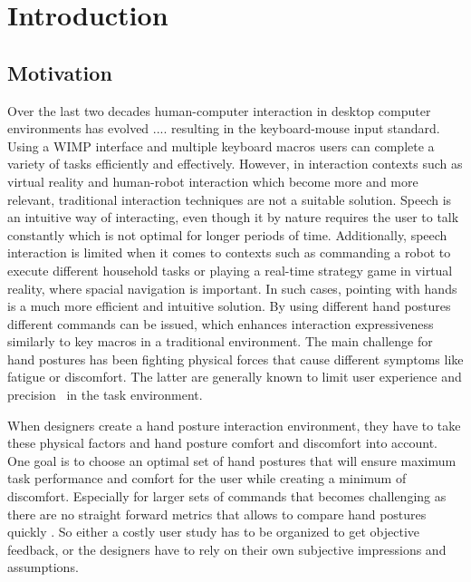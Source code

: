 
\chapter{Introduction}\label{chapter:introduction}

\section{Motivation}
Over the last two decades human-computer interaction in desktop computer environments has evolved .... resulting in the keyboard-mouse input standard. Using a WIMP interface and multiple keyboard macros users can complete a variety of tasks efficiently and effectively.
However, in interaction contexts such as virtual reality and human-robot interaction which become more and more relevant, traditional interaction techniques are not a suitable solution. Speech is an intuitive way of interacting, even though it by nature requires the user to talk constantly which is not optimal for longer periods of time. Additionally, speech interaction is limited when it comes to contexts such as commanding a robot to execute different household tasks or playing a real-time strategy game in virtual reality, where spacial navigation is important. In such cases, pointing with hands is a much more efficient and intuitive solution. By using different hand postures different commands can be issued, which enhances interaction expressiveness similarly to key macros in a traditional environment.
The main challenge for hand postures has been fighting physical forces that cause different symptoms like fatigue or discomfort. The latter are generally known to limit user experience and precision~\cite{short1999precision} in the task environment.

When designers create a hand posture interaction environment, they have to take these physical factors and hand posture comfort and discomfort into account. One goal is to choose an optimal set of hand postures that will ensure maximum task performance and comfort for the user while creating a minimum of discomfort. Especially for larger sets of commands that becomes challenging as there are no straight forward metrics that allows to compare hand postures quickly \cite{naddeo2015proposal}. So either a costly user study has to be organized to get objective feedback, or the designers have to rely on their own subjective impressions and assumptions.

